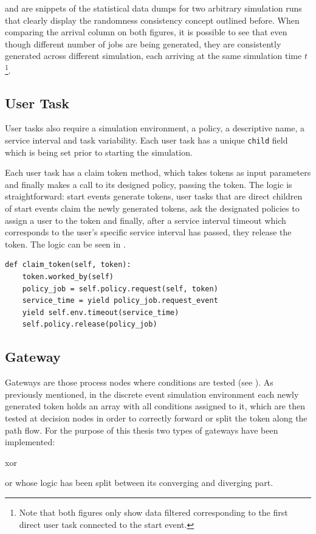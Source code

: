  and  are snippets of the statistical data dumps for two arbitrary simulation runs that clearly display the randomness consistency concept outlined before. When comparing the arrival column on both figures, it is possible to see that even though different number of jobs are being generated, they are consistently generated across different simulation, each arriving at the same simulation time $t$\footnote{Note that both figures only show data filtered corresponding to the first direct user task connected to the start event.}.

\subsection{User Task}
\label{subsec:user_task}

User tasks also require a simulation environment, a policy, a descriptive name, a service interval and task variability. Each user task has a unique \texttt{child} field which is being set prior to starting the simulation.

Each user task has a claim token method, which takes tokens as input parameters and finally makes a call to its designed policy, passing the token. The logic is straightforward: start events generate tokens, user tasks that are direct children of start events claim the newly generated tokens, ask the designated policies to assign a user to the token and finally, after a service interval timeout which corresponds to the user's specific service interval has passed, they release the token. The logic can be seen in .

\begin{lstlisting}[caption=User task claim method,label=lst:user_task,style=CustomPython]
def claim_token(self, token):
    token.worked_by(self)
    policy_job = self.policy.request(self, token)
    service_time = yield policy_job.request_event
    yield self.env.timeout(service_time)
    self.policy.release(policy_job)
\end{lstlisting}

\subsection{Gateway}

Gateways are those process nodes where conditions are tested (see ). As previously mentioned, in the discrete event simulation environment each newly generated token holds an array with all conditions assigned to it, which are then tested at decision nodes in order to correctly forward or split the token along the path flow. For the purpose of this thesis two types of gateways have been implemented:
\begin{enumerate*}
     \item \gls{xor}
     \item \gls{or} whose logic has been split between its converging and diverging part.
 \end{enumerate*} 

